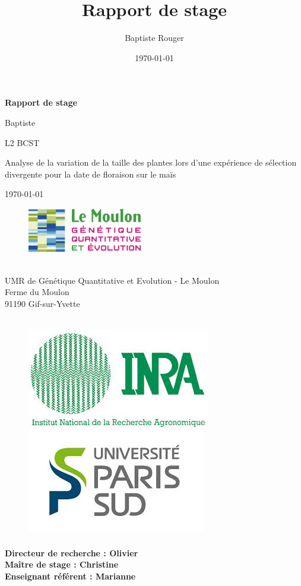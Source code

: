 \documentclass[12pt,a4paper]{report}
\author{Baptiste Rouger}
\title{Rapport de stage}
\date{\today}
\newcommand{\com}[1]{{\noindent  \color{red}#1}}
\begin{document}
	\begin{titlepage}
		
		\begin{center}
			\vfill
			
			{\Huge \textbf{Rapport de stage}}
			
			\vfill
			
			{\LARGE Baptiste }
			
			\com{L2 BCST}
			
			\vfill
			
			{\Huge Analyse de la variation de la taille des plantes lors d'une expérience de sélection divergente pour la date de floraison sur le maïs}
			
			\vfill
			
			{\large\today}
			
			\vfill
			\end{center}
			
			\begin{figure}
				\includegraphics[width=5cm]{logo.jpg}
			\end{figure} ~\\ %
			UMR de Génétique Quantitative et Evolution - Le Moulon\\
			Ferme du Moulon\\
			91190 Gif-sur-Yvette \\ \\
			
			\begin{figure}[h]
				\centering
				\includegraphics[width = 4 cm]{inra.jpg}
				\includegraphics[width = 4 cm]{upsud.jpg}
			\end{figure}
			
			\paragraph*{Directeur de recherche : Olivier  \\
			Maître de stage : Christine \\
			Enseignant référent : Marianne  }
			\vfill
	\end{titlepage}
	
\end{document}
